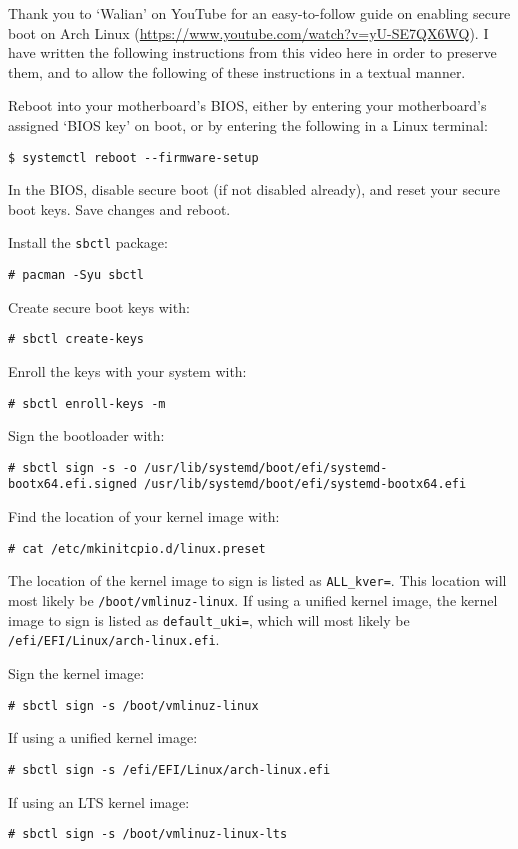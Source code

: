 \documentclass[a4paper]{article}
\begin{document}
Thank you to `Walian' on YouTube for an easy-to-follow guide on enabling secure boot on Arch Linux (\url{https://www.youtube.com/watch?v=yU-SE7QX6WQ}).
I have written the following instructions from this video here in order to preserve them, and to allow the following of these instructions in a textual manner.

Reboot into your motherboard's BIOS, either by entering your motherboard's assigned `BIOS key' on boot, or by entering the following in a Linux terminal:
\begin{lstlisting}
$ systemctl reboot --firmware-setup
\end{lstlisting}

In the BIOS, disable secure boot (if not disabled already), and reset your secure boot keys.
Save changes and reboot.

Install the \lstinline|sbctl| package:
\begin{lstlisting}
# pacman -Syu sbctl
\end{lstlisting}

Create secure boot keys with:
\begin{lstlisting}
# sbctl create-keys
\end{lstlisting}

Enroll the keys with your system with:
\begin{lstlisting}
# sbctl enroll-keys -m
\end{lstlisting}

Sign the bootloader with:
\begin{lstlisting}
# sbctl sign -s -o /usr/lib/systemd/boot/efi/systemd-bootx64.efi.signed /usr/lib/systemd/boot/efi/systemd-bootx64.efi
\end{lstlisting}

Find the location of your kernel image with:
\begin{lstlisting}
# cat /etc/mkinitcpio.d/linux.preset 
\end{lstlisting}

The location of the kernel image to sign is listed as \lstinline|ALL_kver=|.
This location will most likely be \lstinline|/boot/vmlinuz-linux|.
If using a unified kernel image, the kernel image to sign is listed as \lstinline|default_uki=|, which will most likely be \lstinline|/efi/EFI/Linux/arch-linux.efi|.

Sign the kernel image:
\begin{lstlisting}
# sbctl sign -s /boot/vmlinuz-linux
\end{lstlisting}
If using a unified kernel image:
\begin{lstlisting}
# sbctl sign -s /efi/EFI/Linux/arch-linux.efi
\end{lstlisting}
If using an LTS kernel image:
\begin{lstlisting}
# sbctl sign -s /boot/vmlinuz-linux-lts
\end{lstlisting}
\end{document}

